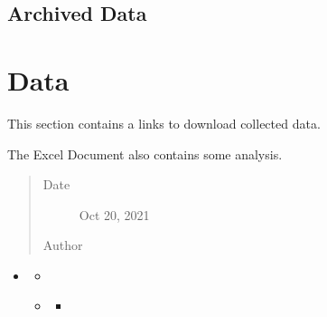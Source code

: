 \documentclass[letterpaper,10pt,english]{sphinxmanual}
\begin{document}
\section{Archived Data}
\label{\detokenize{pdf:archived-data}}

\chapter{Data}
\label{\detokenize{data:data}}\label{\detokenize{data:data-page}}\label{\detokenize{data::doc}}
\begin{sphinxShadowBox}

\sphinxAtStartPar
This section contains a links to download collected data.

\sphinxAtStartPar
The Excel Document also contains some analysis.
\begin{quote}\begin{description}
\item[{Date}] \leavevmode
\sphinxAtStartPar
Oct 20, 2021

\item[{Author}] \leavevmode
\sphinxAtStartPar
{}

\end{description}\end{quote}
\end{sphinxShadowBox}

\begin{sphinxShadowBox}
\begin{itemize}
\item {} 
\sphinxAtStartPar
{}\label{\detokenize{data:id2}}{\hyperref[\detokenize{data:data}]{}}
\begin{itemize}
\item {} 
\sphinxAtStartPar
{}\label{\detokenize{data:id3}}{\hyperref[\detokenize{data:current-data}]{}}

\item {} 
\sphinxAtStartPar
{}\label{\detokenize{data:id4}}{\hyperref[\detokenize{data:archived-data}]{}}
\begin{itemize}
\item {} 
\sphinxAtStartPar
{}\label{\detokenize{data:id5}}{\hyperref[\detokenize{data:id1}]{}}

\end{itemize}

\end{itemize}

\end{itemize}
\end{sphinxShadowBox}
\end{document}
